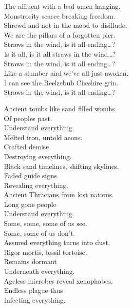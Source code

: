 The affluent with a bad omen hanging. \\
Monstrosity scarce breaking freedom. \\
Shrewd and not in the mood to disillude. \\
We are the pillars of a forgotten pier. \\

Straws in the wind, is it all ending…? \\
Is it all, is it all straws in the wind…? \\

Straws in the wind, is it all ending…? \\

Like a slumber and we've all just awoken. \\
I can see the Beelzebub Cheshire grin. \\

Straws in the wind, is it all ending…? \\






Ancient tombs like sand filled wombs \\
Of peoples  past. \\
Understand everything. \\
Melted iron, untold aeons. \\
Crafted demise \\
Destroying everything. \\

Black sand timelines, shifting skylines. \\
Faded guide signs \\
Revealing everything. \\
Ancient Thracians from lost nations. \\
Long gone people \\
Understand everything. \\

Some, some, some of us see. \\
Some, some of us don't. \\
Assured everything turns into dust. \\

Rigor mortis, fossil tortoise. \\
Remains dormant \\
Underneath everything. \\
Ageless microbes reveal xenophobes. \\
Endless plague thus \\
Infecting everything. \\

